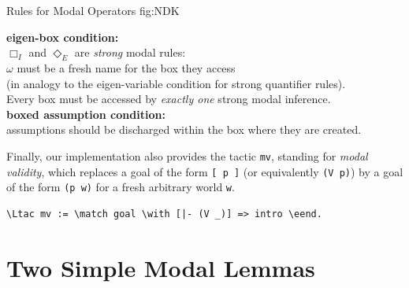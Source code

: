 \documentclass{llncs}
\newcommand{\nec}{\Box} %
\newcommand{\pos}{\Diamond} %
\newcommand{\red}[1]{\textcolor[rgb]{1,0,0}{#1}}
\newcommand{\blue}[1]{\textcolor[rgb]{0,0,1}{#1}}
\newcommand{\Ltac}{\red{Ltac}}
\newcommand{\match}{\blue{match}}
\newcommand{\with}{\blue{with}}
\newcommand{\eend}{\blue{end}}
\begin{document}
\begin{calculus}
{Rules for Modal Operators}
{fig:NDK}

\vspace{1em}

\s\s\s\s
\infer[\nec_I]{\nec A}{\omega: \fbox{\infer*{A}{}} }
\s\s\s\s
\infer[\nec_E]{w: \fbox{ \infer*{}{A} } }{\nec A}

\vspace{2em}

\s\s\s\s
\infer[\pos_I]{\pos A}{w: \fbox{\infer*{A}{}} }
\s\s\s\s
\infer[\pos_E]{\omega: \fbox{ \infer*{}{A} } }{\pos A}

\vspace{1em}

\begin{center}
\textbf{eigen-box condition:}\\ 
$\nec_I$ and $\pos_E$ are \emph{strong} modal rules: \\
$\omega$ must be a fresh name for the box they access \\ 
(in analogy to the eigen-variable condition for strong quantifier rules). \\
Every box must be accessed by \emph{exactly one} strong modal inference. \\
\vspace{0.5em}
\textbf{boxed assumption condition:} \\
assumptions should be discharged within the box where they are created.
\end{center}

\vspace{1em}
\end{calculus}


Finally, our implementation also provides the tactic \texttt{mv},
standing for \emph{modal validity}, which replaces a goal of the form
\texttt{[ p ]} (or equivalently \texttt{(V p)}) by a goal of the form
\texttt{(p w)} for a fresh arbitrary world \texttt{w}.

\begin{Verbatim}[commandchars=\\\{\},fontsize=\verbsize]
\Ltac mv := \match goal \with [|- (V _)] => intro \eend.
\end{Verbatim}



\section{Two Simple Modal Lemmas}
\label{sec:SimpleExamples}
\end{document}
